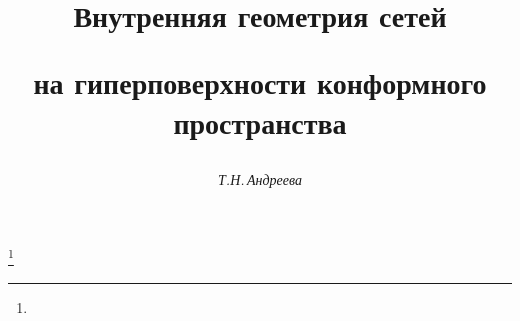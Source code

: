 

 




 


\newcommand{\up}[2]{\overset{#1}{#2}{}} 


\newcommand{\eqdef}{\overset{\mathrm{def}}{=}{}} 


\newcommand{\tts}[1]{} 


 


 




\setcounter{page}{78} 












 


\author{\it Т.Н.\,Андреева} 




\title{Внутренняя геометрия сетей 


на гиперповерхности конформного пространства} 


\thanks{} 


 


\date{} 




\pagestyle{plain} %


 




